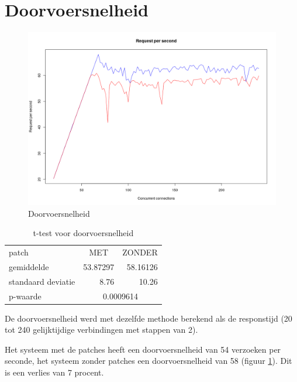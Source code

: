 \section{Doorvoersnelheid}

\begin{figure}
	\includegraphics[width=1.0\linewidth]{img/rps.png}
	\caption{Doorvoersnelheid}
	\label{fig:rps}
\end{figure}

\begin{table}[]
	\centering
	\caption{t-test voor doorvoersnelheid}
	\label{t_rps}
	\begin{tabular}{l|cr}
		\hline
		patch              & MET                          & \multicolumn{1}{c}{ZONDER} \\
		gemiddelde         & \multicolumn{1}{r}{53.87297} & 58.16126                   \\
		standaard deviatie & \multicolumn{1}{r}{8.76}     & 10.26                      \\ \hline
		p-waarde           & \multicolumn{2}{c|}{0.0009614}                           
	\end{tabular}
\end{table}

De doorvoersnelheid werd met dezelfde methode berekend als de responstijd (20 tot 240 gelijktijdige verbindingen met stappen van 2).

Het systeem met de patches heeft een doorvoersnelheid van 54 verzoeken per seconde, het systeem zonder patches een doorvoersnelheid van 58 (figuur \ref{fig:rps}).
Dit is een verlies van 7 procent.
